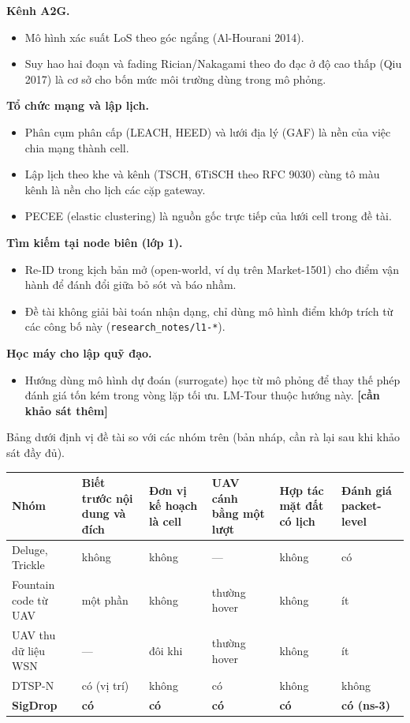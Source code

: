\textbf{Kênh A2G.}

\begin{itemize}
\tightlist
\item
  Mô hình xác suất LoS theo góc ngẩng (Al-Hourani 2014).
\item
  Suy hao hai đoạn và fading Rician/Nakagami theo đo đạc ở độ cao thấp
  (Qiu 2017) là cơ sở cho bốn mức môi trường dùng trong mô phỏng.
\end{itemize}

\textbf{Tổ chức mạng và lập lịch.}

\begin{itemize}
\tightlist
\item
  Phân cụm phân cấp (LEACH, HEED) và lưới địa lý (GAF) là nền của việc
  chia mạng thành cell.
\item
  Lập lịch theo khe và kênh (TSCH, 6TiSCH theo RFC 9030) cùng tô màu
  kênh là nền cho lịch các cặp gateway.
\item
  PECEE (elastic clustering) là nguồn gốc trực tiếp của lưới cell trong
  đề tài.
\end{itemize}

\textbf{Tìm kiếm tại node biên (lớp 1).}

\begin{itemize}
\tightlist
\item
  Re-ID trong kịch bản mở (open-world, ví dụ trên Market-1501) cho điểm
  vận hành để đánh đổi giữa bỏ sót và báo nhầm.
\item
  Đề tài không giải bài toán nhận dạng, chỉ dùng mô hình điểm khớp trích
  từ các công bố này (\texttt{research\_notes/l1-*}).
\end{itemize}

\textbf{Học máy cho lập quỹ đạo.}

\begin{itemize}
\tightlist
\item
  Hướng dùng mô hình dự đoán (surrogate) học từ mô phỏng để thay thế
  phép đánh giá tốn kém trong vòng lặp tối ưu. LM-Tour thuộc hướng này.
  \textbf{{[}cần khảo sát thêm{]}}
\end{itemize}

Bảng dưới định vị đề tài so với các nhóm trên (bản nháp, cần rà lại sau
khi khảo sát đầy đủ).

\begin{longtable}[]{@{}llllll@{}}
\toprule\noalign{}
Nhóm & Biết trước nội dung và đích & Đơn vị kế hoạch là cell & UAV cánh
bằng một lượt & Hợp tác mặt đất có lịch & Đánh giá packet-level \\
\midrule\noalign{}
\endhead
\bottomrule\noalign{}
\endlastfoot
Deluge, Trickle & không & không & --- & không & có \\
Fountain code từ UAV & một phần & không & thường hover & không & ít \\
UAV thu dữ liệu WSN & --- & đôi khi & thường hover & không & ít \\
DTSP-N & có (vị trí) & không & có & không & không \\
\textbf{SigDrop} & \textbf{có} & \textbf{có} & \textbf{có} & \textbf{có}
& \textbf{có (ns-3)} \\
\end{longtable}

